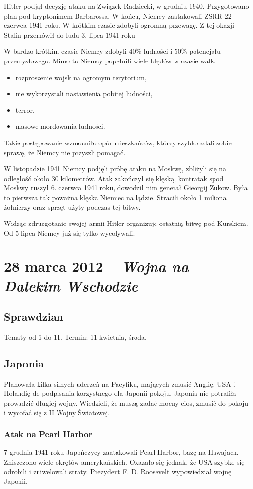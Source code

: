 \documentclass [a4paper, 11pt, oneside]{book}
\begin{document}
Hitler podjął decyzję ataku na Związek Radziecki, w grudniu 1940. Przygotowano plan pod kryptonimem Barbarossa. W końcu, Niemcy zaatakowali ZSRR 22 czerwca 1941 roku. W krótkim czasie zdobyli ogromną przewagę. Z tej okazji Stalin przemówił do ludu 3. lipca 1941 roku.

W bardzo krótkim czasie Niemcy zdobyli 40\% ludności i 50\% potencjału przemysłowego. Mimo to Niemcy popełnili wiele błędów w czasie walk:
\begin{itemize}
\item rozproszenie wojsk na ogromym terytorium,
\item nie wykorzystali nastawienia pobitej ludności,
\item terror,
\item masowe mordowania ludności.
\end{itemize}
Takie postępowanie wzmocniło opór mieszkańców, którzy szybko zdali sobie sprawę, że Niemcy nie przyszli pomagać.

W listopadzie 1941 Niemcy podjęli próbę ataku na Moskwę, zbliżyli się na odległość około 30 kilometrów. Atak zakończył się klęską, kontratak spod Moskwy ruszył 6. czerwca 1941 roku, dowodził nim generał Gieorgij Zukow. Była to pierwsza tak poważna klęska Niemiec na lądzie. Stracili około 1 miliona żołnierzy oraz sprzęt użyty podczas tej bitwy.

Widząc zdruzgotanie swojej armii Hitler organizuje ostatnią bitwę pod Kurskiem. Od 5 lipca Niemcy już się tylko wycofywali.

\chapter{28 marca 2012 -- \textit{Wojna na Dalekim Wschodzie}}

\section{Sprawdzian}
Tematy od 6 do 11. Termin: 11 kwietnia, środa.

\section{Japonia}
Planowała kilka silnych uderzeń na Pacyfiku, mających zmusić Anglię, USA i Holandię do podpisania korzystnego dla Japonii pokoju. Japonia nie potrafiła prowadzić długiej wojny. Wiedzieli, że muszą zadać mocny cios, zmusić do pokoju i wycofać się z II Wojny Światowej.

\subsection{Atak na Pearl Harbor}
7 grudnia 1941 roku Japończycy zaatakowali Pearl Harbor, bazę na Hawajach. Zniszczono wiele okrętów amerykańskich. Okazało się jednak, że USA szybko się odrobili i zniwelowali straty. Prezydent F. D. Roosevelt wypowiedział wojnę Japonii.
\end{document}
